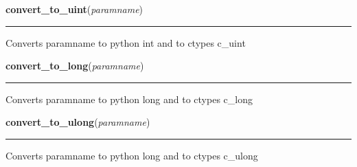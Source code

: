     \label{xformslib:library:convert_to_uint}

    \vspace{0.5ex}

\hspace{.8\funcindent}\begin{boxedminipage}{\funcwidth}

    \raggedright \textbf{convert\_to\_uint}(\textit{paramname})

    \vspace{-1.5ex}

    \rule{\textwidth}{0.5\fboxrule}
\setlength{\parskip}{2ex}

Converts paramname to python int and to ctypes c\_uint
\setlength{\parskip}{1ex}
    \end{boxedminipage}

    \label{xformslib:library:convert_to_long}

    \vspace{0.5ex}

\hspace{.8\funcindent}\begin{boxedminipage}{\funcwidth}

    \raggedright \textbf{convert\_to\_long}(\textit{paramname})

    \vspace{-1.5ex}

    \rule{\textwidth}{0.5\fboxrule}
\setlength{\parskip}{2ex}

Converts paramname to python long and to ctypes c\_long
\setlength{\parskip}{1ex}
    \end{boxedminipage}

    \label{xformslib:library:convert_to_ulong}

    \vspace{0.5ex}

\hspace{.8\funcindent}\begin{boxedminipage}{\funcwidth}

    \raggedright \textbf{convert\_to\_ulong}(\textit{paramname})

    \vspace{-1.5ex}

    \rule{\textwidth}{0.5\fboxrule}
\setlength{\parskip}{2ex}

Converts paramname to python long and to ctypes c\_ulong
\setlength{\parskip}{1ex}
    \end{boxedminipage}

